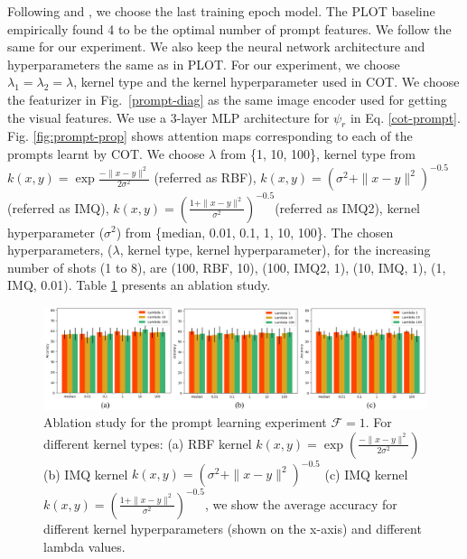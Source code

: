 Following \cite{chen2023plot} and \cite{coop}, we choose the last training epoch model. The PLOT baseline empirically found 4 to be the optimal number of prompt features. We follow the same for our experiment. We also keep the neural network architecture and hyperparameters the same as in PLOT. For our experiment, we choose $\lambda_1=\lambda_2=\lambda$, kernel type and the kernel hyperparameter used in COT. We choose the featurizer in Fig.~\ref{prompt-diag} as the same image encoder used for getting the visual features. We use a 3-layer MLP architecture for $\psi_r$ in Eq. \ref{cot-prompt}. Fig. \ref{fig:prompt-prop} shows attention maps corresponding to each of the prompts learnt by COT. We choose $\lambda$ from \{1, 10, 100\}, kernel type from {$k(x, y) = \exp{\frac{-\|x-y\|^2}{2\sigma^2}}$ (referred as RBF), $k(x, y)=(\sigma^2+\|x-y\|^2)^{-0.5}$ (referred as IMQ), $k(x, y) = \left(\frac{1+\|x-y\|^2}{\sigma^2} \right)^{-0.5}$(referred as IMQ2)}, kernel hyperparameter ($\sigma^2$) from \{median, 0.01, 0.1, 1, 10, 100\}. The chosen hyperparameters, ($\lambda$, kernel type, kernel hyperparameter), for the increasing number of shots (1 to 8), are (100, RBF, 10), (100, IMQ2, 1), (10, IMQ, 1), (1, IMQ, 0.01). Table \ref{tbl:prompt-abl} presents an ablation study.

\begin{figure}[ht!]
    \centering
    \includegraphics[width=\columnwidth]{chapter-3/images/prompt-ablation.pdf}
    \caption{Ablation study for the prompt learning experiment $\mathcal{F}=1$. For different kernel types: (a) RBF kernel $k(x, y)=\exp{\left(\frac{-\|x-y\|^2}{2\sigma^2}\right)}$ (b) IMQ kernel $k(x, y)=\left(\sigma^2+\|x-y\|^2\right)^{-0.5}$ (c) IMQ kernel $k(x, y) = \left(\frac{1+\|x-y\|^2}{\sigma^2} \right)^{-0.5}$, we show the average accuracy for different kernel hyperparameters (shown on the x-axis) and different lambda values.}
    \label{tbl:prompt-abl}
\end{figure}





\resumetoc